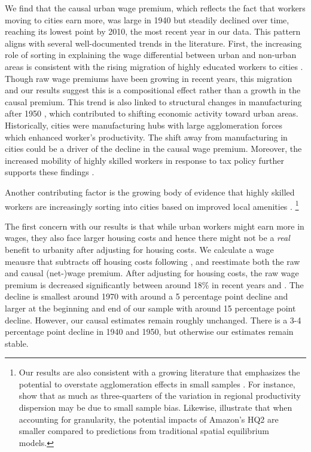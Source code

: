 \documentclass[12pt]{article}
\newcommand{\kyle}[1]{\iftoggle{INCLUDECOMMENTS}{{\color{magenta}\textbf{Kyle:} #1}}{}}
\begin{document}
We find that the causal urban wage premium, which reflects the fact that workers moving to cities earn more, was large in 1940 but steadily declined over time, reaching its lowest point by 2010, the most recent year in our data. 
This pattern aligns with several well-documented trends in the literature. 
First, the increasing role of sorting in explaining the wage differential between urban and non-urban areas is consistent with the rising migration of highly educated workers to cities \citep*{shapiro2006smart, moretti2013real, Diamond_2016}. 
Though raw wage premiums have been growing in recent years, this migration and our results suggest this is a compositional effect rather than a growth in the causal premium. 
This trend is also linked to structural changes in manufacturing after 1950 \citep*{dumais2002geographic, glaeser2010did}, which contributed to shifting economic activity toward urban areas. 
Historically, cities were manufacturing hubs with large agglomeration forces which enhanced worker's productivity. 
The shift away from manufacturing in cities could be a driver of the decline in the causal wage premium. 
Moreover, the increased mobility of highly skilled workers in response to tax policy further supports these findings \citep*{moretti2017effect, verginer2021talent, akcigit2016taxation}.

\kyle{We have these, but not sure where to put them}
Another contributing factor is the growing body of evidence that highly skilled workers are increasingly sorting into cities based on improved local amenities \citep*{baum2020accounting, Diamond_2016, su2022rising, glaeser2001consumer, glaeser2003urban, glaeser2009wealth}. 
\footnote{
  Our results are also consistent with a growing literature that emphasizes the potential to overstate agglomeration effects in small samples \citep*{ahlfeldt2022granular, dingel2020spatial, schoefer2022productivity}. 
  For instance, \citet*{schoefer2022productivity} show that as much as three-quarters of the variation in regional productivity dispersion may be due to small sample bias. Likewise, \citet*{dingel2020spatial} illustrate that when accounting for granularity, the potential impacts of Amazon's HQ2 are smaller compared to predictions from traditional spatial equilibrium models.
}

The first concern with our results is that while urban workers might earn more in wages, they also face larger housing costs and hence there might not be a \emph{real} benefit to urbanity after adjusting for housing costs.
We calculate a wage meausre that subtracts off housing costs following \citet{ganong2017has}, and reestimate both the raw and causal (net-)wage premium. 
After adjusting for housing costs, the raw wage premium is decreased significantly between around 18\% in recent years and . 
The decline is smallest around 1970 with around a 5 percentage point decline and larger at the beginning and end of our sample with around 15 percentage point decline. 
However, our causal estimates remain roughly unchanged. 
There is a 3-4 percentage point decline in 1940 and 1950, but otherwise our estimates remain stable. 
\kyle{This is likely due to the fact that \emph{rent} is an amenity that people sort on and we absorb that impact already.}
\end{document}
